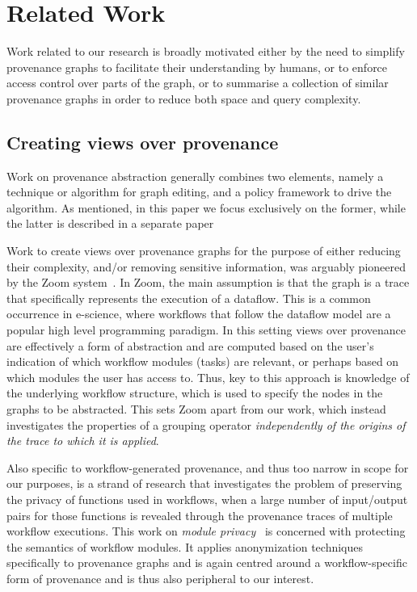 \section{Related Work}  \label{sec:related}

Work related to our research is broadly motivated either by the need to simplify provenance graphs to facilitate their understanding by humans, or to enforce access control over parts of the graph, or to summarise a collection of similar provenance graphs in order to reduce both space and query complexity.

\subsection{Creating views over provenance}

Work on provenance abstraction generally combines two elements, namely a technique or algorithm for graph editing, and a policy framework to drive the algorithm. As mentioned, in this paper we focus exclusively on the former, while the latter is described in a separate paper

 

Work to create views over provenance graphs for the purpose of either reducing their complexity, and/or removing sensitive information, was arguably pioneered by the Zoom system~\citep{DBLP:conf/icde/BitonBDH08}. In Zoom, the main assumption is that  the graph is a trace that specifically represents the execution of a dataflow. This is a common occurrence in e-science, where workflows that follow the  dataflow model are a popular high level programming paradigm.
%
In this setting views over provenance are effectively a form of abstraction and are computed based on the user's indication of which workflow modules (tasks) are relevant, or perhaps based on which modules the user has access to. Thus, key to this approach is knowledge of the underlying workflow structure, which is used to specify the nodes in the graphs to be abstracted. This sets Zoom apart from our work, which instead investigates the properties of a grouping operator \textit{independently of the origins of the trace to which it is applied}. 

Also specific to workflow-generated provenance, and thus too narrow in scope for our purposes, is a  strand of research that investigates the problem of preserving the privacy of functions used in workflows, when a large number of input/output pairs for those functions is revealed through the provenance traces of multiple workflow executions. This work on  \textit{module privacy}~\citep{Davidson:2011:PP:1938551.1938554,Davidson2010a,Davidson:2011:PVM:1989284.1989305} is concerned with protecting the semantics of workflow modules. 
It applies anonymization techniques specifically to provenance graphs and is again centred around a workflow-specific form of provenance and  is thus also peripheral to our interest.

